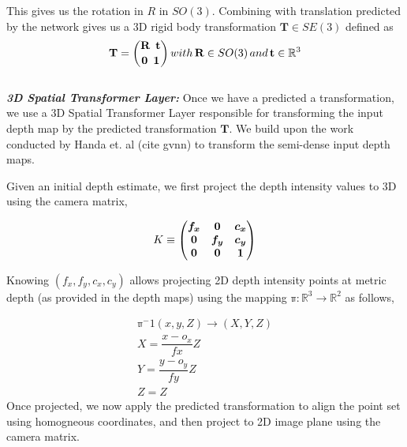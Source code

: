 \documentclass[letterpaper, 10 pt, conference]{ieeeconf}  %
\begin{document}
This gives us the rotation in \textbf{$R$} in $SO(3)$. Combining with translation predicted by the network gives us a  3D rigid body transformation $\textbf{T}\in SE(3)$ defined as\\
\begin{equation}
    \textbf{T} = \binom{\textbf{R} \enspace \textbf{t}}{\textbf{0} \enspace \textbf{1}} \thinspace with \thinspace \textbf{R} \in SO(3) \thinspace and \thinspace \textbf{t} \in \mathbb{R}^3
\end{equation}\\

\textbf{\textit{3D Spatial Transformer Layer:}} Once we have a predicted a transformation, we use a 3D Spatial Transformer Layer responsible for transforming the input depth map by the predicted transformation $\textbf{T}$. We build upon the work conducted by Handa et. al (cite gvnn) to transform the semi-dense input depth maps.

Given an initial depth estimate, we first project the depth intensity values to 3D using the camera matrix,

\begin{equation}
\begin{split}
    \boldmath{K} \equiv
    \left(
    \begin{matrix}
    f_x&0&c_x\\ 
    0&f_y&c_y\\ 
    0&0&1\\
    \end{matrix}
    \right)\\
\end{split}
\end{equation} 


Knowing $(f_x, f_y, c_x, c_y)$ allows projecting 2D depth intensity points at metric depth (as provided in the depth maps) using the mapping $\mathbb{\pi}:\mathbb{R}^3\rightarrow\mathbb{R}^2$ as follows,

\begin{equation}
\begin{split}
    \mathbb{\pi}^-1(x,y,Z) \rightarrow (X,Y,Z)\\ 
    X = \dfrac{x - o_x}{fx}Z\\
    Y = \dfrac{y - o_y}{fy}Z\\
    Z = Z
\end{split}
\end{equation} 
Once projected, we now apply the predicted transformation to align the point set using homogneous coordinates, and then project to 2D image plane using the camera matrix.
\end{document}
